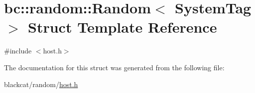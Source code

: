 \hypertarget{structbc_1_1random_1_1Random}{}\section{bc\+:\+:random\+:\+:Random$<$ System\+Tag $>$ Struct Template Reference}
\label{structbc_1_1random_1_1Random}


{\ttfamily \#include $<$host.\+h$>$}



The documentation for this struct was generated from the following file\+:\begin{DoxyCompactItemize}
\item 
blackcat/random/\hyperlink{random_2host_8h}{host.\+h}\end{DoxyCompactItemize}
